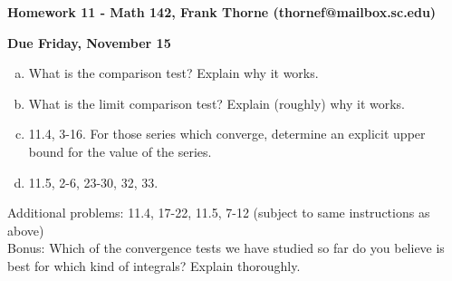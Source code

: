 \documentclass[12pt]{article}
\begin{document}
\setlength{\topmargin}{-2mm}





\begin{center}{\bf Homework 11 - Math 142, Frank Thorne (thornef@mailbox.sc.edu)}
\end{center}
\begin{center}
{\bf Due Friday, November 15}
\end{center}

\begin{enumerate}[(a)]

\item
What is the comparison test? Explain why it works.

\item
What is the limit comparison test? Explain (roughly) why it works.

\item
11.4, 3-16. For those series which converge, determine an explicit upper bound for the value
of the series.

\item
11.5, 2-6, 23-30, 32, 33. 
\end{enumerate}
Additional problems: 11.4, 17-22, 11.5, 7-12 (subject to same instructions as above)
\\
Bonus: Which of the convergence tests we have studied so far do you believe is best for which
kind of integrals? Explain thoroughly.
\end{document}
